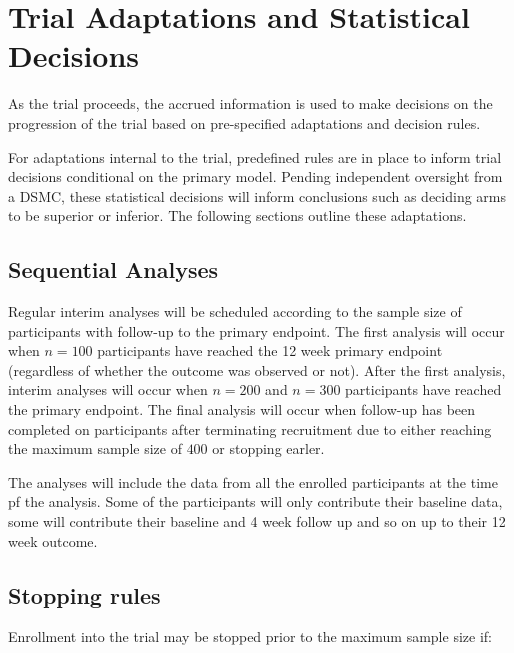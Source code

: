 \documentclass[
]{article}
\begin{document}
\clearpage

\hypertarget{trial-adaptations-and-statistical-decisions}{%
  \section{Trial Adaptations and Statistical Decisions}\label{trial-adaptations-and-statistical-decisions}}

As the trial proceeds, the accrued information is used to make decisions on the progression of the trial based on pre-specified adaptations and decision rules.

For adaptations internal to the trial, predefined rules are in place to inform trial decisions conditional on the primary model.
Pending independent oversight from a DSMC, these statistical decisions will inform conclusions such as deciding arms to be superior or inferior.
The following sections outline these adaptations.

\hypertarget{sequential-analyses}{%
  \subsection{Sequential Analyses}\label{sequential-analyses}}

Regular interim analyses will be scheduled according to the sample size of participants with follow-up to the primary endpoint.
The first analysis will occur when \(n=100\) participants have reached the 12 week primary endpoint (regardless of whether the outcome was observed or not).
After the first analysis, interim analyses will occur when $n=200$ and $n=300$ participants have reached the primary endpoint.
The final analysis will occur when follow-up has been completed on participants after terminating recruitment due to either reaching the maximum sample size of \(400\) or stopping earler.

The analyses will include the data from all the enrolled participants at the time pf the analysis.
Some of the participants will only contribute their baseline data, some will contribute their baseline and 4 week follow up and so on up to their 12 week outcome.

\hypertarget{stopping-rules}{%
  \subsection{Stopping rules}\label{stopping-rules}}

Enrollment into the trial may be stopped prior to the maximum sample size if:
\end{document}
